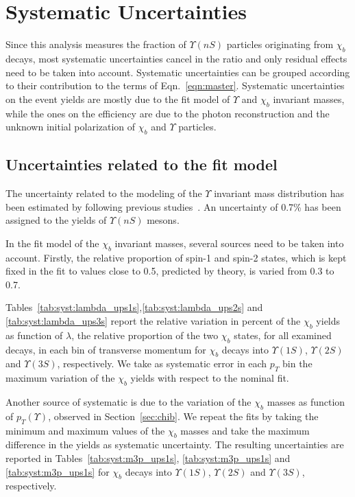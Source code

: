 \section{Systematic Uncertainties}
\label{sec:syst}

Since this analysis measures the fraction of $\Upsilon(nS)$ particles
originating from $\chi_b$ decays, most systematic uncertainties cancel in the
ratio and only residual effects need to be taken into account. Systematic
uncertainties can be grouped according to their contribution to the terms of
Eqn.~\ref{eqn:master}. Systematic uncertainties on the event yields are mostly
due to the fit model of $\Upsilon$ and $\chi_b$ invariant masses, while the
ones on the efficiency are due to the photon reconstruction and the unknown
initial polarization of $\chi_b$ and $\Upsilon$ particles.
 

\subsection{Uncertainties related to the fit model}

The uncertainty related to the modeling of the $\Upsilon$ invariant mass
distribution has been estimated by following previous
studies~\cite{Aaij:2013yaa}. An uncertainty of 0.7\% has been assigned to the
yields of $\Upsilon(nS)$ mesons.

In the fit model of the $\chi_b$ invariant masses, several sources need to be
taken into account. Firstly, the relative proportion of spin-1 and spin-2
states, which is kept fixed in the fit to values close to 0.5, predicted by
theory, is varied from 0.3 to 0.7.


Tables~\ref{tab:syst:lambda_ups1s},\ref{tab:syst:lambda_ups2s} and
\ref{tab:syst:lambda_ups3s} report the relative variation in percent of the
$\chi_b$ yields as function of $\lambda$, the relative proportion of the two
$\chi_b$ states, for all examined decays, in each bin of transverse momentum
for $\chi_b$ decays into $\Upsilon(1S)$, $\Upsilon(2S)$ and $\Upsilon(3S)$,
respectively. We take as systematic error in each $p_T$ bin the maximum
variation of the $\chi_b$ yields with respect to the nominal fit.

Another source of systematic is due to the variation of the $\chi_b$ masses as
function of $p_T(\Upsilon)$, observed in Section~\ref{sec:chib}. We repeat the
fits by taking the minimum and maximum values of the $\chi_b$ masses and take
the maximum difference in the yields as systematic uncertainty. The resulting
uncertainties are reported in Tables~\ref{tab:syst:m3p_ups1s},
\ref{tab:syst:m3p_ups1s} and \ref{tab:syst:m3p_ups1s} for $\chi_b$ decays into
$\Upsilon(1S)$, $\Upsilon(2S)$ and $\Upsilon(3S)$, respectively.
 
